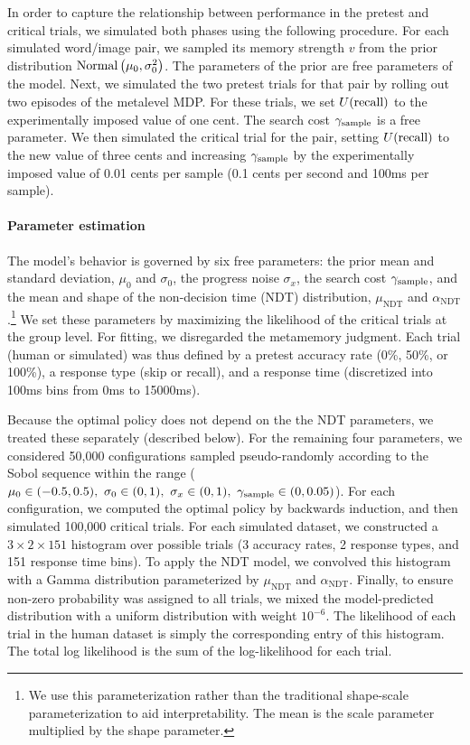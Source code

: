 In order to capture the relationship between performance in the pretest and critical trials, we simulated both phases using the following procedure. For each simulated word/image pair, we sampled its memory strength $v$ from the prior distribution $\mathrm{Normal}\left( \mu_0, \sigma_0^2 \right)$. The parameters of the prior are free parameters of the model. Next, we simulated the two pretest trials for that pair by rolling out two episodes of the metalevel MDP. For these trials, we set $U({\text{recall}})$ to the experimentally imposed value of one cent. The search cost $\gamma_\text{sample}$ is a free parameter. We then simulated the critical trial for the pair, setting $U({\text{recall}})$ to the new value of three cents and increasing $\gamma_\text{sample}$ by the experimentally imposed value of 0.01 cents per sample (0.1 cents per second and 100ms per sample).

\paragraph{Parameter estimation}

The model's behavior is governed by six free parameters: the prior mean and standard deviation, $\mu_0$ and $\sigma_0$, the progress noise $\sigma_x$, the search cost $\gamma_\text{sample}$, and the mean and shape of the non-decision time (NDT) distribution, $\mu_\text{NDT}$ and $\alpha_\text{NDT}$.\footnote{%
  We use this parameterization rather than the traditional shape-scale parameterization to aid interpretability. The mean is the scale parameter multiplied by the shape parameter.
} We set these parameters by maximizing the likelihood of the critical trials at the group level. For fitting, we disregarded the metamemory judgment. Each trial (human or simulated) was thus defined by a pretest accuracy rate (0\%, 50\%, or 100\%), a response type (skip or recall), and a response time (discretized into 100ms bins from 0ms to 15000ms). 

Because the optimal policy does not depend on the the NDT parameters, we treated these separately (described below). For the remaining four parameters, we considered 50,000 configurations sampled pseudo-randomly according to the Sobol sequence \citep{sobol1967distribution,bergstra2012random} within the range ($\mu_0 \in (-0.5, 0.5),\ \sigma_0 \in (0, 1),\ \sigma_x \in (0, 1),\ \gamma_\text{sample} \in (0, 0.05)$). For each configuration, we computed the optimal policy by backwards induction, and then simulated 100,000 critical trials. For each simulated dataset, we constructed a $3 \times 2 \times 151$ histogram over possible trials (3 accuracy rates, 2 response types, and 151 response time bins). To apply the NDT model, we convolved this histogram with a Gamma distribution parameterized by $\mu_\text{NDT}$ and $\alpha_\text{NDT}$. Finally, to ensure non-zero probability was assigned to all trials, we mixed the model-predicted distribution with a uniform distribution with weight $10^{-6}$. The likelihood of each trial in the human dataset is simply the corresponding entry of this histogram. The total log likelihood is the sum of the log-likelihood for each trial.

